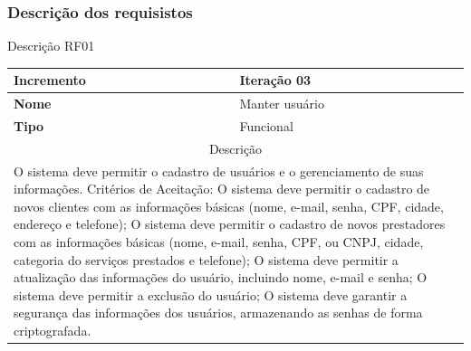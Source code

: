 \subsubsection{ Descrição dos requisistos}
\clearpage
\begin{quadro}[htb]
	\centering
	\caption{\label{Formatação do texto.}Descrição RF01}	
	\begin{tabular}{|l|p{11cm}|}
		\hline
		\textbf{Incremento}    & Iteração 03\\ \hline
		\textbf{Nome}    & Manter usuário\\ \hline
		\textbf{Tipo}    & Funcional\\ \hline
		\multicolumn{2}{|c|}{Descrição}\\ \hline
		\multicolumn{2}{|p{12cm}|}{
			O sistema deve permitir o cadastro de usuários e o gerenciamento de suas informações. \newline
			\newline Critérios de Aceitação: \newline
			O sistema deve permitir o cadastro de novos clientes com as informações básicas (nome, e-mail, senha, CPF, cidade, endereço e telefone); \newline
			\newline O sistema deve permitir o cadastro de novos prestadores com as informações básicas (nome, e-mail, senha, CPF, ou CNPJ, cidade, categoria do serviços prestados e telefone); \newline
			\newline O sistema deve permitir a atualização das informações do usuário, incluindo nome, e-mail e senha; \newline
			\newline O sistema deve permitir a exclusão do usuário; \newline
			O sistema deve garantir a segurança das informações dos usuários, armazenando as senhas de forma criptografada.
			} \\ \hline
	\end{tabular}
\end{quadro}

